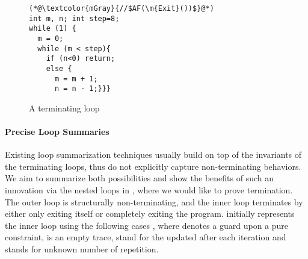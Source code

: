 \documentclass[acmsmall,screen,review,anonymous,nonacm]{acmart}
\begin{document}
\begin{wrapfigure}{R}{0.3\columnwidth}
\begin{lstlisting}[xleftmargin=0.5em,numbersep=6pt,basicstyle=\footnotesize\ttfamily]
(*@\textcolor{mGray}{//$AF(\m{Exit}())$}@*)
int m, n; int step=8; 
while (1) {
  m = 0;
  while (m < step){
    if (n<0) return; 
    else {
      m = m + 1;
      n = n - 1;}}}
\end{lstlisting} 
\caption{A terminating loop} 
\label{fig:Termination_analysis_without_the_tears}
\end{wrapfigure}


\paragraph*{\textbf{Precise Loop Summaries}} 
\label{sec:example:Infinite_Loops_1}

Existing loop summarization techniques \cite{DBLP:conf/tacas/TsitovichSWK11,DBLP:journals/tse/XieCZLLL19,DBLP:conf/sigsoft/XieCZLLL17} usually build on top of the invariants of the terminating loops, thus do not explicitly capture non-terminating behaviors. 
We aim to summarize both possibilities and show the benefits of such an innovation via the nested loops in , where we would like to prove termination. 
The outer loop is structurally non-terminating, and the inner loop terminates by either only exiting itself or completely exiting the program. 
\toolName initially represents the inner loop using the following cases , where \code{[\pi]} denotes a guard upon a pure constraint, \code{\epsilon} is an empty trace,  stand for the updated  after each iteration and \code{\star} stands for unknown number of repetition.

\end{document}
